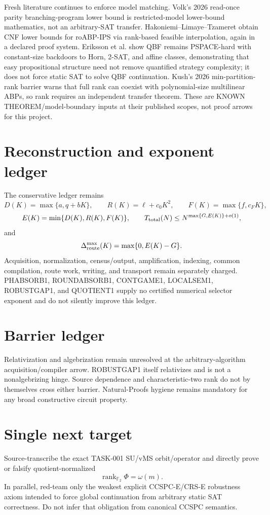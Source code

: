 \documentclass[11pt]{article}
\begin{document}
Fresh literature continues to enforce model matching. Volk's 2026 read-once parity branching-program lower bound is restricted-model lower-bound mathematics, not an arbitrary-SAT transfer. Hakoniemi--Limaye--Tzameret obtain CNF lower bounds for roABP-IPS via rank-based feasible interpolation, again in a declared proof system. Eriksson et al. show QBF remains PSPACE-hard with constant-size backdoors to Horn, 2-SAT, and affine classes, demonstrating that easy propositional structure need not remove quantified strategy complexity; it does not force static SAT to solve QBF continuation. Kush's 2026 min-partition-rank barrier warns that full rank can coexist with polynomial-size multilinear ABPs, so rank requires an independent transfer theorem. These are KNOWN THEOREM/model-boundary inputs at their published scopes, not proof arrows for this project.

\section*{Reconstruction and exponent ledger}
The conservative ledger remains
\[
D(K)=\max\{a,q+bK\},\qquad
R(K)=\ell+c_0K^2,\qquad
F(K)=\max\{f,c_FK\},
\]
\[
E(K)=\min\{D(K),R(K),F(K)\},
\qquad
T_{\rm total}(N)\le N^{\max\{G,E(K)\}+o(1)},
\]
and
\[
\Delta_{\rm route}^{\max}(K)=\max\{0,E(K)-G\}.
\]
Acquisition, normalization, census/output, amplification, indexing, common compilation, route work, writing, and transport remain separately charged. PHABSORB1, ROUNDABSORB1, CONTGAME1, LOCALSEM1, ROBUSTGAP1, and QUOTIENT1 supply no certified numerical selector exponent and do not silently improve this ledger.

\section*{Barrier ledger}
Relativization and algebrization remain unresolved at the arbitrary-algorithm acquisition/compiler arrow. ROBUSTGAP1 itself relativizes and is not a nonalgebrizing hinge. Source dependence and characteristic-two rank do not by themselves cross either barrier. Natural-Proofs hygiene remains mandatory for any broad constructive circuit property.

\section*{Single next target}
Source-transcribe the exact TASK-001 SU/vMS orbit/operator and directly prove or falsify quotient-normalized
\[
\operatorname{rank}_{\mathbb F_2}\Phi=\omega(m).
\]
In parallel, red-team only the weakest explicit CCSPC-E/CRS-E robustness axiom intended to force global continuation from arbitrary static SAT correctness. Do not infer that obligation from canonical CCSPC semantics.
\end{document}
